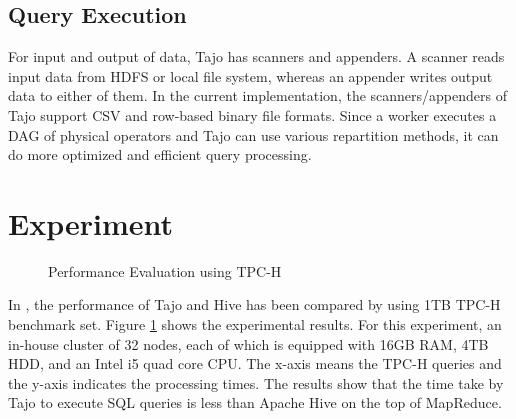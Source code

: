 \documentclass[9pt,twocolumn,twoside]{../../styles/osajnl}
\begin{document}
\subsection{Query Execution}
For input and output of data, Tajo has scanners and appenders. A
scanner reads input data from HDFS or local file system, whereas an
appender writes output data to either of them. In the current
implementation, the scanners/appenders of Tajo support CSV and
row-based binary file formats. Since a worker executes a DAG of
physical operators and Tajo can use various repartition methods, it
can do more optimized and efficient query processing.

\section{Experiment}


\begin{figure}[htbp]
\centering
{}
\caption{\cite{tajo-paper} Performance Evaluation using TPC-H}
\label{fig:experiments}
\end{figure}

\noindent
In \cite{tajo-paper}, the performance of Tajo and Hive has been
compared by using 1TB TPC-H benchmark \cite{www-benchmark-tpch}
set. Figure \ref{fig:experiments} shows the experimental results. For
this experiment, an in-house cluster of 32 nodes, each of which is
equipped with 16GB RAM, 4TB HDD, and an Intel i5 quad core CPU. The
x-axis means the TPC-H queries and the y-axis indicates the processing
times. The results show that the time take by Tajo to execute SQL
queries is less than Apache Hive on the top of MapReduce.
\end{document}
